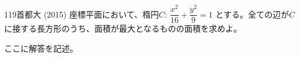 \begin{thm}{119}{}{首都大 (2015)}
 座標平面において、楕円$C$: $\dfrac{x^2}{16}+\dfrac{y^2}{9}=1$ とする。全ての辺が$C$に接する長方形のうち、面積が最大となるものの面積を求めよ。
\end{thm}

ここに解答を記述。